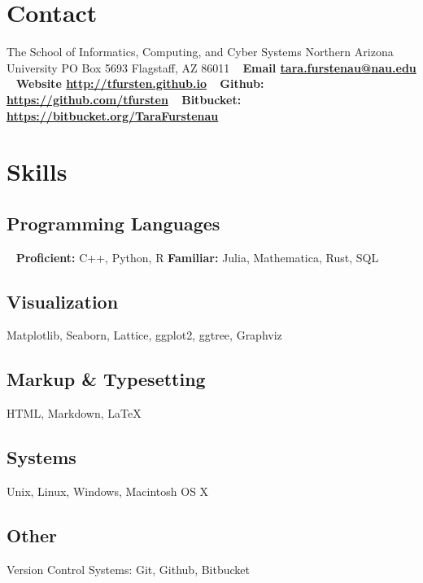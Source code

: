 \documentclass[]{cv-style}          %
\begin{document}
\lastupdated


\begin{aside}
%
\section{Contact}
The School of Informatics, Computing, and Cyber Systems
Northern Arizona University
PO Box 5693
Flagstaff, AZ 86011
~
\textbf{Email \textbf{\Letter}
\href{mailto:tara.furstenau@nau.edu}{tara.furstenau@nau.edu}}
~
\textbf{Website \textbf{\Mundus}
\href{http://tfursten.github.io}{http://tfursten.github.io}}
~
\textbf{Github:
\href{https://github.com/tfursten}{https://github.com/tfursten}}
~
\textbf{Bitbucket:
\href{https://bitbucket.org/TaraFurstenau}{https://bitbucket.org/TaraFurstenau}}
%
\section{Skills}
\subsection{Programming Languages}
~
\textbf{Proficient:} C++, Python, R\newline
\textbf{Familiar:} Julia, Mathematica, Rust, SQL
\subsection{Visualization}
Matplotlib, Seaborn, Lattice, ggplot2, ggtree, Graphviz
\subsection{Markup \& Typesetting}
HTML, Markdown, \LaTeX
\subsection{Systems}
Unix, Linux, Windows, Macintosh OS X
\subsection{Other}
Version Control Systems: Git, Github, Bitbucket
%
\end{aside}
\end{document}
